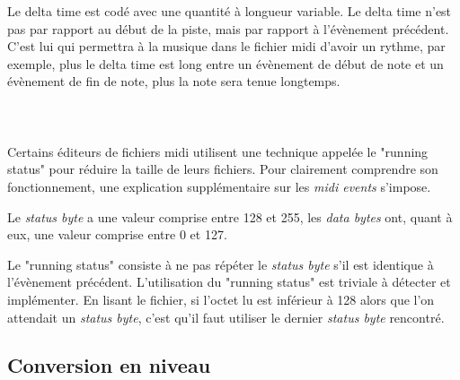 Le delta time est codé avec une quantité à longueur variable. Le delta time n'est pas par rapport au début de la piste, mais par rapport à l'évènement précédent. C'est lui qui permettra à la musique dans le fichier midi d'avoir un rythme, par exemple, plus le delta time est long entre un évènement de début de note et un évènement de fin de note, plus la note sera tenue longtemps.\\\\

\\\\

Certains éditeurs de fichiers midi utilisent une technique appelée le "running status" pour réduire la taille de leurs fichiers. Pour clairement comprendre son fonctionnement, une explication supplémentaire sur les \textit{midi events} s'impose.

Le \textit{status byte} a une valeur comprise entre 128 et 255, les \textit{data bytes} ont, quant à eux, une valeur comprise entre 0 et 127.

Le "running status" consiste à ne pas répéter le \textit{status byte} s'il est identique à l'évènement précédent. L'utilisation du "running status" est triviale à détecter et implémenter. En lisant le fichier, si l'octet lu est inférieur à 128 alors que l'on attendait un \textit{status byte}, c'est qu'il faut utiliser le dernier \textit{status byte} rencontré.

\subsection{Conversion en niveau}

